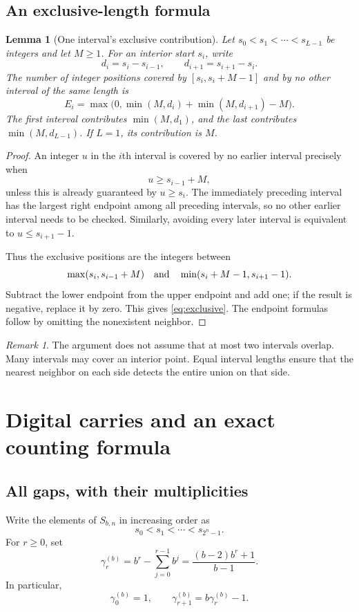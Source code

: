 \documentclass[11pt,letterpaper]{article}
\numberwithin{equation}{section}
\newtheorem{lemma}[lemma]{Lemma}
\theoremstyle{definition}
\theoremstyle{remark}
\newtheorem{remark}[remark]{Remark}
\begin{document}
\subsection{An exclusive-length formula}
\begin{lemma}[One interval's exclusive contribution]\label{lem:exclusive}
Let $s_0<s_1<\cdots<s_{L-1}$ be integers and let $M\ge1$. For an interior start $s_i$, write
\[
 d_i=s_i-s_{i-1},\qquad d_{i+1}=s_{i+1}-s_i.
\]
The number of integer positions covered by $[s_i,s_i+M-1]$ and by no other interval of the same length is
\begin{equation}\label{eq:exclusive}
 E_i=\max\bigl(0,\min(M,d_i)+\min(M,d_{i+1})-M\bigr).
\end{equation}
The first interval contributes $\min(M,d_1)$, and the last contributes $\min(M,d_{L-1})$. If $L=1$, its contribution is $M$.
\end{lemma}
\begin{proof}
An integer $u$ in the $i$th interval is covered by no earlier interval precisely when
\[
 u\ge s_{i-1}+M,
\]
unless this is already guaranteed by $u\ge s_i$. The immediately preceding interval has the largest right endpoint among all preceding intervals, so no other earlier interval needs to be checked. Similarly, avoiding every later interval is equivalent to $u\le s_{i+1}-1$.

Thus the exclusive positions are the integers between
\[
 \max(s_i,s_{i-1}+M)
 \quad\hbox{and}\quad
 \min(s_i+M-1,s_{i+1}-1).
\]
Subtract the lower endpoint from the upper endpoint and add one; if the result is negative, replace it by zero. This gives \eqref{eq:exclusive}. The endpoint formulas follow by omitting the nonexistent neighbor.
\end{proof}

\begin{remark}
The argument does not assume that at most two intervals overlap. Many intervals may cover an interior point. Equal interval lengths ensure that the nearest neighbor on each side detects the entire union on that side.
\end{remark}

\section{Digital carries and an exact counting formula}\label{sec:gaps}

\subsection{All gaps, with their multiplicities}
Write the elements of $S_{b,n}$ in increasing order as
\[
 s_0<s_1<\cdots<s_{2^n-1}.
\]
For $r\ge0$, set
\begin{equation}\label{eq:gammadef}
 \gamma_r^{(b)}
 =b^r-\sum_{j=0}^{r-1}b^j
 =\frac{(b-2)b^r+1}{b-1}.
\end{equation}
In particular,
\begin{equation}\label{eq:gammarec}
 \gamma_0^{(b)}=1,\qquad
 \gamma_{r+1}^{(b)}=b\gamma_r^{(b)}-1.
\end{equation}
\end{document}

